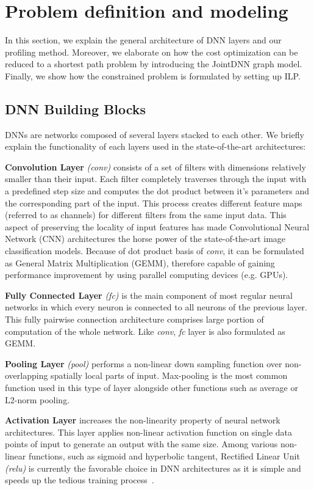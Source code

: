 \section{Problem definition and modeling}
In this section, we explain the general architecture of DNN layers and our profiling method. Moreover, we elaborate on how the cost optimization can be reduced to a shortest path problem by introducing the JointDNN graph model. Finally, we show how the constrained problem is formulated by setting up ILP. 

\subsection{DNN Building Blocks}
DNNs are networks composed of several layers stacked to each other. We briefly explain the functionality of each layers used in the state-of-the-art architectures: 

\textbf{Convolution Layer} \textit{(conv)} consists of a set of filters with dimensions relatively smaller than their input. Each filter completely traverses through the input with a predefined step size and computes the dot product between it's parameters and the corresponding part of the input. This process creates different feature maps (referred to as channels) for different filters from the same input data. This aspect of preserving the locality of input features has made Convolutional Neural Network (CNN) architectures the horse power of the state-of-the-art image classification models. Because of dot product basis of \textit{conv}, it can be formulated as General Matrix Multiplication (GEMM), therefore capable of gaining performance improvement by using parallel computing devices (e.g. GPUs). 

\textbf{Fully Connected Layer} \textit{(fc)} is the main component of most regular neural networks in which every neuron is connected to all neurons of the previous layer. This fully pairwise connection architecture comprises large portion of computation of the whole network. Like \textit{conv}, \textit{fc} layer is also formulated as GEMM. 

\textbf{Pooling Layer} \textit{(pool)} performs a non-linear down sampling function over non-overlapping spatially local parts of input. Max-pooling is the most common function used in this type of layer alongside other functions such as average or L2-norm pooling. 

\textbf{Activation Layer} increases the non-linearity property of neural network architectures. This layer applies non-linear activation function on single data points of input to generate an output with the same size. Among various non-linear functions, such as sigmoid and hyperbolic tangent, Rectified Linear Unit \textit{(relu)} is currently the favorable choice in DNN architectures as it is simple and speeds up the tedious training process~\cite{ReLUpaper}. 

